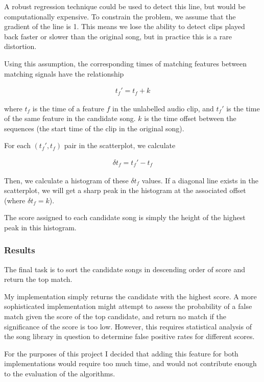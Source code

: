 \documentclass[12pt,a4paper,twoside,openright]{report}
\begin{document}
A robust regression technique could be used to detect this line, but would be computationally expensive. To constrain the problem, we assume that the gradient of the line is 1. This means we lose the ability to detect clips played back faster or slower than the original song, but in practice this is a rare distortion.

Using this assumption, the corresponding times of matching features between matching signals have the relationship

\begin{align*}
  t_f' = t_f + k 
\end{align*}

where $t_f$ is the time of a feature $f$ in the unlabelled audio clip, and $t_f'$ is the time of the same feature in the candidate song. $k$ is the time offset between the sequences (the start time of the clip in the original song).

For each $(t_f',t_f)$ pair in the scatterplot, we calculate

\begin{align*}
  \delta t_f = t_f' - t_f
\end{align*}

Then, we calculate a histogram of these $\delta t_f$ values. If a diagonal line exists in the scatterplot, we will get a sharp peak in the histogram at the associated offset (where $\delta t_f = k$).

The score assigned to each candidate song is simply the height of the highest peak in this histogram.


\subsubsection{Results}

The final task is to sort the candidate songs in descending order of score and return the top match. 

My implementation simply returns the candidate with the highest score. A more sophisticated implementation might attempt to assess the probability of a false match given the score of the top candidate, and return no match if the significance of the score is too low. However, this requires statistical analysis of the song library in question to determine false positive rates for different scores.

For the purposes of this project I decided that adding this feature for both implementations would require too much time, and would not contribute enough to the evaluation of the algorithms.
\end{document}
